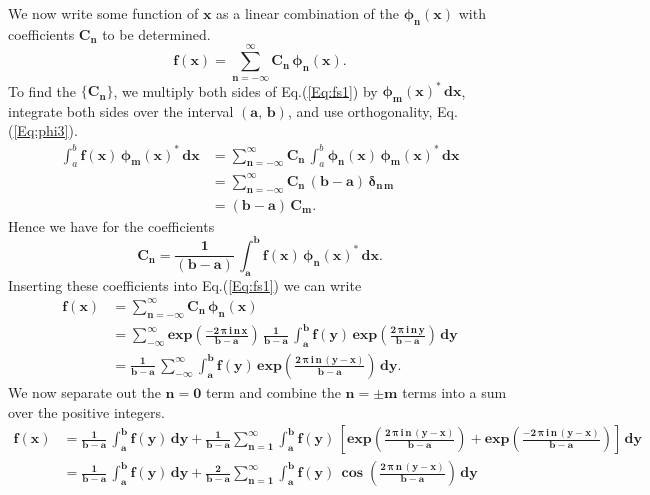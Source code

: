 \documentclass[12pt]{article}
\begin{document}
  
\noindent We now write some function of $\mathbf{x}$ as a linear combination 
  of the $\boldsymbol{\phi_{n}(x)}$ with coefficients $\mathbf{C_{n}}$ to be
  determined.
\begin{equation} \label{Eq:fs1}
\mathbf{f(x) = \sum_{n = -\infty}^{\infty} C_{n} \,} \boldsymbol{\phi}_{\mathbf{n}}\mathbf{(x)}.
\end{equation}
To find the $\{\mathbf{C_{n}} \}$, we multiply both sides of Eq.(\ref{Eq:fs1}) by
  $\mathbf{\boldsymbol{\phi}_{m}(x)^{\ast}  \, dx}$, integrate
  both sides over the interval $\mathbf{(a,\,b)}$, and use orthogonality, Eq.(\ref{Eq:phi3}).
\begin{align*}
  \int_{a}^{b} \mathbf{f(x)} \,\boldsymbol{\phi}_{\mathbf{m}}(\mathbf{x})^{\ast}  \, \mathbf{dx} &=
\mathbf{\sum_{n = -\infty}^{\infty} C_{n} } \, \int_{a}^{b} \boldsymbol{\phi}_{\mathbf{n}}\mathbf{(x)}
 \, \boldsymbol{\phi}_{\mathbf{m}} \mathbf{(x)}^{\ast}  \, \mathbf{dx} \\
  &= \mathbf{\sum_{n = -\infty}^{\infty} C_{n}\,(b-a)} \, \boldsymbol{\delta}_{\mathbf{n\,m}} \\
  &= \mathbf{(b - a)\,C_{m}}.
\end{align*}
Hence we have for the coefficients
\begin{equation} \label{Eq:fs2}
\mathbf{C_{n} = \frac{1}{(b-a)}\,
\int_{a}^{b} f(x)} \,\boldsymbol{\phi}_{\mathbf{n}}(\mathbf{x})^{\ast}  \, \mathbf{dx}.
\end{equation}
Inserting these coefficients into Eq.(\ref{Eq:fs1}) we can write
\begin{align*}
\mathbf{f(x)} &= \mathbf{ \sum_{n = -\infty}^{\infty} C_{n} \,} \boldsymbol{\phi}_{\mathbf{n}}\mathbf{(x)} \\
             &= \mathbf{ \sum_{-\infty}^{\infty} exp \left(\frac{- 2\,\boldsymbol{\pi}\,i\,n\,x}{b-a} \right)} \,
\mathbf{ \frac{1}{b - a}\,\int_{a}^{b} f(y)\,exp \left(\frac{ 2\,\boldsymbol{\pi}\,i\,n\,y}{b-a} \right)\,dy } \\
			 &= \mathbf{\frac{1}{b-a}\,	\sum_{-\infty}^{\infty} 
			      \int_{a}^{b} f(y)\,exp \left(\frac{ 2\,\boldsymbol{\pi}\,i\,n\,(y-x)}{b-a} \right)\,dy. }
\end{align*}
We now separate out the $\mathbf{n=0}$ term and combine the $\mathbf{n = \pm m}$ terms into
 a sum over the positive integers. 
\begin{align*}
\mathbf{f(x)} &= \mathbf{ \frac{1}{b-a} \, \int_{a}^{b} f(y)\,dy} +
\mathbf{\frac{1}{b-a}  \sum_{n=1}^{\infty} \int_{a}^{b} f(y)\,
\left[ exp \left(\frac{ 2\,\boldsymbol{\pi}\,i\,n\,(y-x)}{b-a} \right) +
        exp \left(\frac{ -2\,\boldsymbol{\pi}\,i\,n\,(y-x)}{b-a} \right) \right] \, dy } \\
 &= \mathbf{ \frac{1}{b-a} \, \int_{a}^{b} f(y)\,dy} + 
	\mathbf{ \frac{2}{b-a} \sum_{n=1}^{\infty}  \int_{a}^{b} f(y)} \,\boldsymbol{\cos }
	 \mathbf{ \left( \frac{ 2\,\boldsymbol{\pi}\,n\,(y-x)}{b-a} \right) \, dy }
\end{align*}
\end{document}
